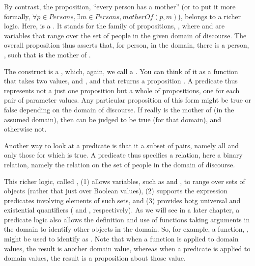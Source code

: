 \documentclass[letterpaper,10pt,english]{sphinxmanual}
\begin{document}
By contrast, the proposition, “every person has a mother” (or to put
it more formally, \(\forall p \in Persons, \exists m \in Persons,
motherOf(p,m)\)), belongs to a richer logic.  Here,  is
a . It stands for the family of propositions,
, where  and  are variables that range
over the set of people in the given domain of discourse.  The overall
proposition thus asserts that, for  person,  in the domain,
there is a person, , such that  is the mother of .

The  construct is a , which,
again, we call a . You can think of it as a function that
takes two values,  and , and that returns a proposition . A predicate thus represents not a just one
proposition but a whole  of propositions, one for each pair of
parameter values. Any particular proposition of this form might be
true or false depending on the domain of discourse. If  really is
the mother of  (in the assumed domain), then  can be
judged to be true (for that domain), and otherwise not.

Another way to look at a predicate is that it  a subset of
 pairs, namely all and only those for which  is
true. A predicate thus specifies a relation, here a binary relation,
namely the  relation on the set of people in the domain of
discourse.

This richer logic, called , (1) allows variables,
such as  and , to range over sets of objects (rather that just
over Boolean values), (2) supports the expression predicates involving
elements of such sets, and (3) provides botg universal and existential
quantifiers ( and , respectively). As we will
see in a later chapter, a predicate logic also allows the definition
and use of functions taking arguments in the domain to identify other
objects in the domain. So, for example, a function, ,
might be used to identify  as . Note that when
a function is applied to domain values, the result is another domain
value, whereas when a predicate is applied to domain values, the
result is a proposition about those value.
\end{document}
